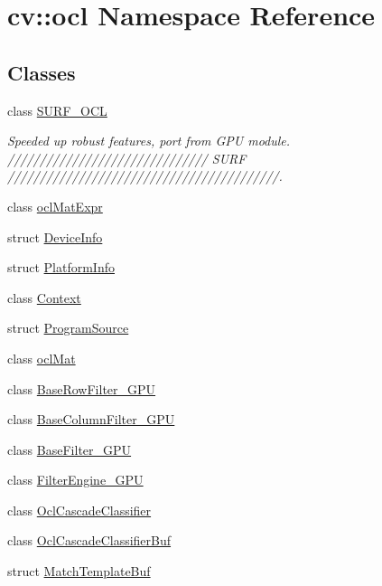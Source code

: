 \hypertarget{namespacecv_1_1ocl}{\section{cv\-:\-:ocl Namespace Reference}
\label{namespacecv_1_1ocl}
}
\subsection*{Classes}
\begin{DoxyCompactItemize}
\item 
class \hyperlink{classcv_1_1ocl_1_1SURF__OCL}{S\-U\-R\-F\-\_\-\-O\-C\-L}
\begin{DoxyCompactList}\small\item\em Speeded up robust features, port from G\-P\-U module. /////////////////////////////// S\-U\-R\-F //////////////////////////////////////////. \end{DoxyCompactList}\item 
class \hyperlink{classcv_1_1ocl_1_1oclMatExpr}{ocl\-Mat\-Expr}
\item 
struct \hyperlink{structcv_1_1ocl_1_1DeviceInfo}{Device\-Info}
\item 
struct \hyperlink{structcv_1_1ocl_1_1PlatformInfo}{Platform\-Info}
\item 
class \hyperlink{classcv_1_1ocl_1_1Context}{Context}
\item 
struct \hyperlink{structcv_1_1ocl_1_1ProgramSource}{Program\-Source}
\item 
class \hyperlink{classcv_1_1ocl_1_1oclMat}{ocl\-Mat}
\item 
class \hyperlink{classcv_1_1ocl_1_1BaseRowFilter__GPU}{Base\-Row\-Filter\-\_\-\-G\-P\-U}
\item 
class \hyperlink{classcv_1_1ocl_1_1BaseColumnFilter__GPU}{Base\-Column\-Filter\-\_\-\-G\-P\-U}
\item 
class \hyperlink{classcv_1_1ocl_1_1BaseFilter__GPU}{Base\-Filter\-\_\-\-G\-P\-U}
\item 
class \hyperlink{classcv_1_1ocl_1_1FilterEngine__GPU}{Filter\-Engine\-\_\-\-G\-P\-U}
\item 
class \hyperlink{classcv_1_1ocl_1_1OclCascadeClassifier}{Ocl\-Cascade\-Classifier}
\item 
class \hyperlink{classcv_1_1ocl_1_1OclCascadeClassifierBuf}{Ocl\-Cascade\-Classifier\-Buf}
\item 
struct \hyperlink{structcv_1_1ocl_1_1MatchTemplateBuf}{Match\-Template\-Buf}
\item 

\end{DoxyCompactItemize}
